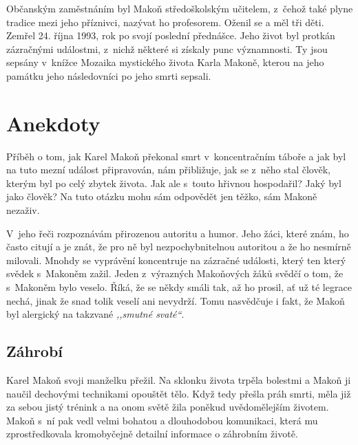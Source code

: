 Občanským zaměstnáním byl Makoň středoškolským učitelem, z~čehož také plyne
tradice mezi jeho příznivci, nazývat ho profesorem. Oženil se a měl tři děti.
Zemřel 24. října 1993, rok po svojí poslední přednášce. Jeho život byl protkán
zázračnými událostmi, z~nichž některé si získaly punc významnosti. Ty jsou
sepsány v~knížce Mozaika mystického života Karla Makoně\cite{mozaika}, kterou na
jeho památku jeho následovníci po jeho smrti sepsali.

\section{Anekdoty}

Příběh o tom, jak Karel Makoň překonal smrt v~koncentračním táboře a jak byl na
tuto mezní událost připravován, nám přibližuje, jak se z~něho stal člověk,
kterým byl po celý zbytek života. Jak ale s~touto hřivnou hospodařil? Jaký byl
jako člověk? Na tuto otázku mohu sám odpovědět jen těžko, sám Makoně nezaživ.

V~jeho řeči rozpoznávám přirozenou autoritu a humor. Jeho žáci, které znám, ho
často citují a je znát, že pro ně byl nezpochybnitelnou autoritou a že ho
nesmírně milovali. Mnohdy se vyprávění koncentruje na zázračné události, který
ten který svědek s~Makoněm zažil. Jeden z~výrazných Makoňových žáků svědčí o
tom, že s~Makoněm bylo veselo. Říká, že se někdy smáli tak, až ho prosil, ať už
té legrace nechá, jinak že snad tolik veselí ani nevydrží. Tomu nasvědčuje i
fakt, že Makoň byl alergický na takzvané \textit{,,smutné svaté``}.

\subsection{Záhrobí}

Karel Makoň svoji manželku přežil. Na sklonku života trpěla bolestmi a Makoň ji
naučil dechovými technikami opouštět tělo. Když tedy přešla práh smrti, měla již
za sebou jistý trénink a na onom světě žila poněkud uvědomělejším životem. Makoň
s~ní pak vedl velmi bohatou a dlouhodobou komunikaci, která mu zprostředkovala
kromobyčejně detailní informace o záhrobním životě.

